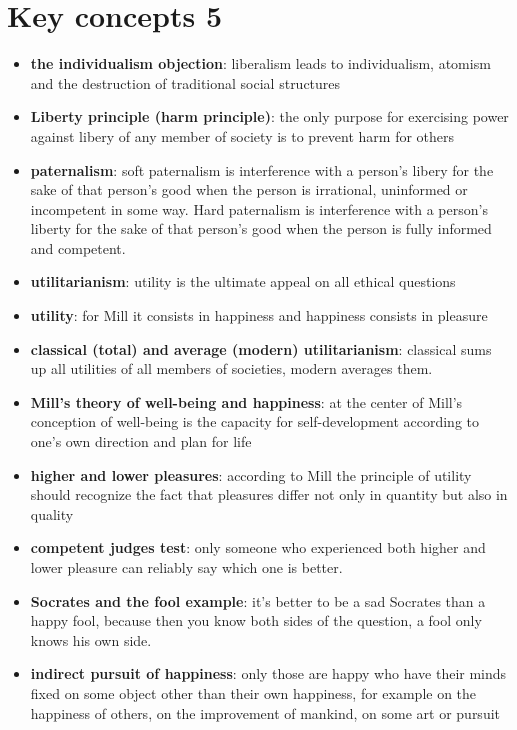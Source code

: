 \section{Key concepts 5}
\begin{itemize}
	\item \textbf{the individualism objection}: liberalism leads to
	 individualism, atomism and the destruction of traditional social
	 structures
	\item \textbf{Liberty principle (harm principle)}: the only purpose for
	 exercising power against libery of any member of society is to prevent
	 harm for others
	\item \textbf{paternalism}: soft paternalism is interference with a
	 person's libery for the sake of that person's good when the person is
	 irrational, uninformed or incompetent in some way. Hard paternalism is
	 interference with a person's liberty for the sake of that person's
	 good when the person is fully informed and competent.
	\item \textbf{utilitarianism}: utility is the ultimate appeal on all
	 ethical questions
	\item \textbf{utility}: for Mill it consists in happiness and happiness
	 consists in pleasure
	\item \textbf{classical (total) and average (modern) utilitarianism}:
	 classical sums up all utilities of all members of societies, modern
	 averages them.
	\item \textbf{Mill’s theory of well-being and happiness}: at the center
	 of Mill's conception of well-being is the capacity for
	 self-development according to one's own direction and plan for life
	\item \textbf{higher and lower pleasures}: according to Mill the
	 principle of utility should recognize the fact that pleasures differ
	 not only in quantity but also in quality
	\item \textbf{competent judges test}: only someone who experienced both
	 higher and lower pleasure can reliably say which one is better.
	\item \textbf{Socrates and the fool example}: it's better to be a sad
	 Socrates than a happy fool, because then you know both sides of the
	 question, a fool only knows his own side.
	\item \textbf{indirect pursuit of happiness}: only those are happy who
	 have their minds fixed on some object other than their own happiness,
	 for example on the happiness of others, on the improvement of mankind,
	 on some art or pursuit

\end{itemize}
